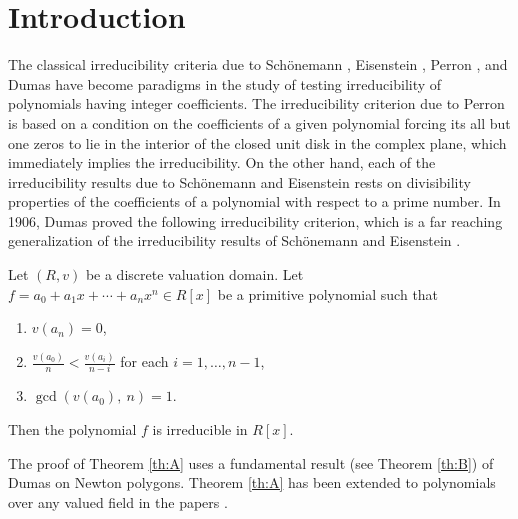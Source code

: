\documentclass[12pt]{amsart}%
\begin{document}
\section{Introduction}
The classical irreducibility criteria due to Sch\"{o}nemann \cite{S}, Eisenstein \cite{E}, Perron \cite{P}, and  Dumas \cite{D} have become paradigms in the study of testing irreducibility of polynomials having integer coefficients. The irreducibility criterion due to Perron \cite{P} is based on a condition on the coefficients of a given polynomial forcing its all but one zeros to lie in the interior of  the closed unit disk in the complex plane, which immediately implies the irreducibility. On the other hand, each of the irreducibility results due to   Sch\"{o}nemann \cite{S} and Eisenstein \cite{E} rests on divisibility properties of the coefficients of a polynomial with respect to a prime number. In 1906, Dumas \cite{D} proved the following irreducibility criterion, which is a far reaching generalization of the irreducibility results of Sch\"{o}nemann \cite{S} and Eisenstein \cite{E}.
\begin{thmx}\label{th:A}
Let $(R,v)$  be a discrete valuation domain. Let $f=a_0 + a_1x + \cdots + a_nx^n \in {R}[x]$ be a primitive polynomial such that
\begin{enumerate}[label=$(\roman*)$]
\item $v(a_n)=0$,
\item $\frac{v(a_0)}{n}<\frac{v(a_i)}{n-i}$ for each $i=1,\ldots,n-1$,
\item $\gcd(v(a_0),~n) = 1$.
\end{enumerate}
Then the polynomial $f$ is irreducible in $R[x]$.
\end{thmx}
The proof of Theorem \ref{th:A} uses a fundamental result (see Theorem \ref{th:B}) of Dumas on Newton polygons. Theorem \ref{th:A} has been extended to polynomials over any valued field in the papers \cite{Kh2017,Kh23}.
\end{document}
